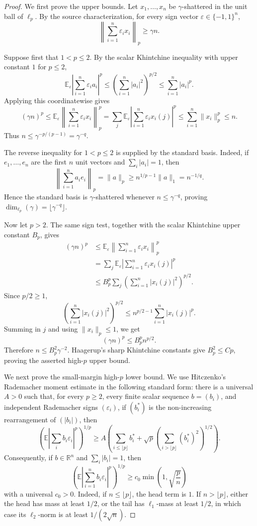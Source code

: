 \documentclass[11pt]{article}
\newcommand{\R}{\mathbb{R}}
\newcommand{\E}{\mathbb{E}}
\newcommand{\eps}{\varepsilon}
\begin{document}
\begin{proof}

We first prove the upper bounds.  Let \(x_1,\ldots,x_n\) be
\(\gamma\)-shattered in the unit ball of \(\ell_p\).  By the source
characterization, for every sign vector \(\eps\in\{-1,1\}^n\),
\[
  \left\|\sum_{i=1}^n \eps_i x_i\right\|_p\ge \gamma n.
\]

Suppose first that \(1<p\le2\).  By the scalar Khintchine inequality with
upper constant \(1\) for \(p\le2\),
\[
 \E_\eps \left|\sum_{i=1}^n \eps_i a_i\right|^p
 \le \left(\sum_{i=1}^n |a_i|^2\right)^{p/2}
 \le \sum_{i=1}^n |a_i|^p .
\]
Applying this coordinatewise gives
\[
(\gamma n)^p
\le
\E_\eps\left\|\sum_{i=1}^n \eps_i x_i\right\|_p^p
=
\sum_j \E_\eps\left|\sum_{i=1}^n \eps_i x_i(j)\right|^p
\le
\sum_{i=1}^n \|x_i\|_p^p
\le n.
\]
Thus \(n\le\gamma^{-p/(p-1)}=\gamma^{-q}\).

The reverse inequality for \(1<p\le2\) is supplied by the standard basis.
Indeed, if \(e_1,\ldots,e_n\) are the first \(n\) unit vectors and
\(\sum_i |a_i|=1\), then
\[
  \left\|\sum_{i=1}^n a_i e_i\right\|_p
  =\|a\|_p
  \ge n^{1/p-1}\|a\|_1
  = n^{-1/q}.
\]
Hence the standard basis is \(\gamma\)-shattered whenever
\(n\le\gamma^{-q}\), proving
\(\dim_{\ell_p}(\gamma)=\lfloor\gamma^{-q}\rfloor\).

Now let \(p>2\).  The same sign test, together with the scalar Khintchine
upper constant \(B_p\), gives
\[
\begin{aligned}
(\gamma n)^p
&\le
\E_\eps\left\|\sum_{i=1}^n \eps_i x_i\right\|_p^p \\
&=
\sum_j \E_\eps\left|\sum_{i=1}^n \eps_i x_i(j)\right|^p \\
&\le
B_p^p \sum_j \left(\sum_{i=1}^n |x_i(j)|^2\right)^{p/2}.
\end{aligned}
\]
Since \(p/2\ge1\),
\[
 \left(\sum_{i=1}^n |x_i(j)|^2\right)^{p/2}
 \le n^{p/2-1}\sum_{i=1}^n |x_i(j)|^p.
\]
Summing in \(j\) and using \(\|x_i\|_p\le1\), we get
\[
(\gamma n)^p\le B_p^p n^{p/2}.
\]
Therefore \(n\le B_p^2\gamma^{-2}\).  Haagerup's sharp Khintchine constants
give \(B_p^2\le C p\), proving the asserted high-\(p\) upper bound.

We next prove the small-margin high-\(p\) lower bound.  We use Hitczenko's
Rademacher moment estimate in the following standard form: there is a
universal \(A>0\) such that, for every \(p\ge2\), every finite scalar sequence
\(b=(b_i)\), and independent Rademacher signs \((\eps_i)\), if
\((b_i^*)\) is the non-increasing rearrangement of \((|b_i|)\), then
\[
 \left(\E\left|\sum_i b_i\eps_i\right|^p\right)^{1/p}
 \ge
 A\left(
   \sum_{i\le \lfloor p\rfloor} b_i^*
   + \sqrt p
       \left(\sum_{i>\lfloor p\rfloor} (b_i^*)^2\right)^{1/2}
 \right).
\]
Consequently, if \(b\in\R^n\) and \(\sum_i |b_i|=1\), then
\[
 \left(\E\left|\sum_{i=1}^n b_i\eps_i\right|^p\right)^{1/p}
 \ge
 c_0\min\left(1,\sqrt{\frac{p}{n}}\right)
\]
with a universal \(c_0>0\).  Indeed, if \(n\le\lfloor p\rfloor\), the head
term is \(1\).  If \(n>\lfloor p\rfloor\), either the head has mass at least
\(1/2\), or the tail has \(\ell_1\)-mass at least \(1/2\), in which case its
\(\ell_2\)-norm is at least \(1/(2\sqrt n)\).


\end{proof}
\end{document}
